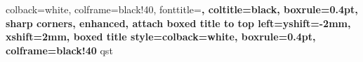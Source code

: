 \renewcommand{\theassignment}{\ifnum\value{assignment}<10 0\fi\arabic{assignment}}

\newcommand{\assignment}[2]{%
	\newpage
	\refstepcounter{assignment} %

	\section*{\xcharter Ass \theassignment: #1 \\ \small #2}%
	\addcontentsline{toc}{section}{Ass \theassignment: #1 (#2)}%

	\setcounter{section}{0}%
	\setcounter{subsection}{0}%
	\setcounter{subsubsection}{0}%
	\setcounter{question}{0}
}

\renewcommand{\theprogetto}{\ifnum\value{progetto}<10 0\fi\arabic{progetto}}

\newcommand{\progetto}[2]{%
	\refstepcounter{progetto} %

	\section*{\xcharter Progetto \theprogetto: #1 \\ \small #2}%
	\addcontentsline{toc}{section}{Progetto \theprogetto: #1 (#2)}%
}

%
{colback=white,
	colframe=black!40,
	fonttitle=\bfseries,
	coltitle=black,
	boxrule=0.4pt,
	sharp corners,
	enhanced,
	attach boxed title to top left={yshift=-2mm, xshift=2mm},
	boxed title style={colback=white, boxrule=0.4pt, colframe=black!40}}%
{qst}

\setlength{\parskip}{3pt} %
\setlength{\parindent}{0pt} %

\makeatletter
\renewcommand\paragraph{\@startsection{paragraph}{4}{\z@}%
	{3.25ex \@plus1ex \@minus.2ex}%
	{-1em}%
	{\normalfont\normalsize\fontseries{b}\selectfont\underline}}
\makeatother

\makeatletter
\renewcommand\subparagraph{\@startsection{subparagraph}{5}{\parindent}
	{3.25ex \@plus1ex \@minus .2ex}
	{-1em}
	{\normalfont\normalsize\underline}}
\makeatother


\pagestyle{fancy} %
\fancyhf{}
\setlength{\headheight}{14pt} %
\fancyhead[RE,LO]{\MakeUppercase \doctitle}
\fancyhead[RO,LE]{\thepage}
